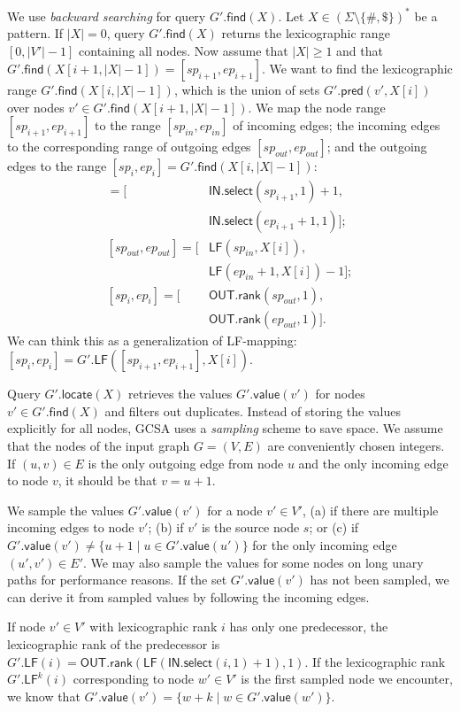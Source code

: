 \documentclass[twoside,leqno,twocolumn]{article}
\newcommand{\set}[1]{\ensuremath{\{ #1 \}}}
\newcommand{\abs}[1]{\ensuremath{\lvert #1 \rvert}}
\newcommand{\rank}{\ensuremath{\mathsf{rank}}}
\newcommand{\select}{\ensuremath{\mathsf{select}}}
\newcommand{\LF}{\ensuremath{\mathsf{LF}}}
\newcommand{\find}{\ensuremath{\mathsf{find}}}
\newcommand{\locate}{\ensuremath{\mathsf{locate}}}
\newcommand{\gpred}{\ensuremath{\mathsf{pred}}}
\newcommand{\gvalue}{\ensuremath{\mathsf{value}}}
\newcommand{\LFmapping}{LF\nobreakdash-mapping}
\newcommand{\patternset}{\ensuremath{(\Sigma \setminus \set{\#, \$})^{\ast}}}
\newcommand{\bvIN}{\ensuremath{\mathsf{IN}}}
\newcommand{\bvOUT}{\ensuremath{\mathsf{OUT}}}
\begin{document}
We use \emph{backward searching} for query $G'.\find(X)$. Let $X \in \patternset$ be a pattern. If $\abs{X} = 0$, query $G'.\find(X)$ returns the lexicographic range $[0, \abs{V'}-1]$ containing all nodes. Now assume that $\abs{X} \ge 1$ and that $G'.\find(X[i+1, \abs{X}-1]) = [sp_{i+1}, ep_{i+1}]$. We want to find the lexicographic range $G'.\find(X[i, \abs{X}-1])$, which is the union of sets $G'.\gpred(v', X[i])$ over nodes $v' \in G'.\find(X[i+1, \abs{X}-1])$. We map the node range $[sp_{i+1}, ep_{i+1}]$ to the range $[sp_{in}, ep_{in}]$ of incoming edges; the incoming edges to the corresponding range of outgoing edges $[sp_{out}, ep_{out}]$; and the outgoing edges to the range $[sp_{i}, ep_{i}] = G'.\find(X[i, \abs{X}-1])$:
\begin{align*}
[sp_{in}, ep_{in}] = [&\bvIN.\select(sp_{i+1}, 1) + 1, \\
 & \bvIN.\select(ep_{i+1}+1, 1)]; \\
[sp_{out}, ep_{out}] = [&\LF(sp_{in}, X[i]), \\
 & \LF(ep_{in}+1, X[i]) - 1]; \\
[sp_{i}, ep_{i}] = [&\bvOUT.\rank(sp_{out}, 1), \\
 & \bvOUT.\rank(ep_{out}, 1)].
\end{align*}
We can think this as a generalization of \LFmapping: $[sp_{i}, ep_{i}] = G'.\LF([sp_{i+1}, ep_{i+1}], X[i])$.

Query $G'.\locate(X)$ retrieves the values $G'.\gvalue(v')$ for nodes $v' \in G'.\find(X)$ and filters out duplicates. Instead of storing the values explicitly for all nodes, GCSA uses a \emph{sampling} scheme to save space. We assume that the nodes of the input graph $G = (V, E)$ are conveniently chosen integers. If $(u, v) \in E$ is the only outgoing edge from node $u$ and the only incoming edge to node $v$, it should be that $v = u+1$.

We sample the values $G'.\gvalue(v')$ for a node $v' \in V'$, (a) if there are multiple incoming edges to node $v'$; (b) if $v'$ is the source node $s$; or (c) if $G'.\gvalue(v') \ne \set{u+1 \mid u \in G'.\gvalue(u')}$ for the only incoming edge $(u', v') \in E'$. We may also sample the values for some nodes on long unary paths for performance reasons. If the set $G'.\gvalue(v')$ has not been sampled, we can derive it from sampled values by following the incoming edges.

If node $v' \in V'$ with lexicographic rank $i$ has only one predecessor, the lexicographic rank of the predecessor is $G'.\LF(i) = \bvOUT.\rank(\LF(\bvIN.\select(i, 1) + 1), 1)$. If the lexicographic rank $G'.\LF^{k}(i)$ corresponding to node $w' \in V'$ is the first sampled node we encounter, we know that $G'.\gvalue(v') = \set{w+k \mid w \in G'.\gvalue(w')}$.
\end{document}

